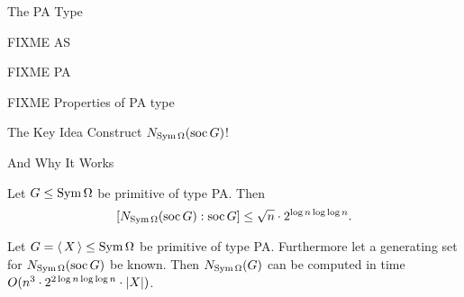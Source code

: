 
\begin{frame}{The PA Type}
    \begin{defn}
        FIXME AS
    \end{defn}

    \begin{defn}
        FIXME PA
    \end{defn}

    \begin{lemma}
        FIXME Properties of PA type
    \end{lemma}
\end{frame}


\begin{frame}{The Key Idea}
    \centering
    {\Large
    Construct $N_{\operatorname{Sym} \Omega}(\operatorname{soc} G)$!
    }
\end{frame}

\begin{frame}{And Why It Works}
    \begin{lemma}
        Let $G \leq \operatorname{Sym} \Omega$ be primitive of type PA.
        Then
        \vspace{-0.5em}
        \[
            [ N_{\operatorname{Sym} \Omega}(\operatorname{soc} G) : \operatorname{soc} G ]
            \leq \sqrt n \cdot 2 ^ {\log n \log \log n}.
        \]
    \end{lemma}

    \begin{lemma}
        Let $G =  \left\langle \, X \, \right\rangle  \leq \operatorname{Sym} \Omega$ be primitive of type PA.
        Furthermore let a generating set for
        $N_{\operatorname{Sym} \Omega}(\operatorname{soc} G)$ be known.
        Then $N_{\operatorname{Sym} \Omega}(G)$ can be computed in time
        $O(n ^ 3 \cdot 2 ^ {2 \log n \log \log n} \cdot  \left| X \right| )$.
    \end{lemma}
\end{frame}
